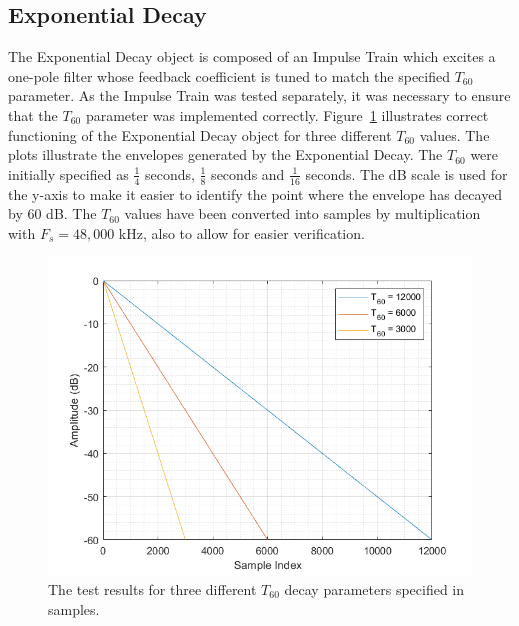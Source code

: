 \documentclass[../main.tex]{subfiles}
\begin{document}
\subsection{Exponential Decay}
The Exponential Decay object is composed of an Impulse Train which excites a one-pole filter whose feedback coefficient is tuned to match the specified $T_{60}$ parameter. As the Impulse Train was tested separately, it was necessary to ensure that the $T_{60}$ parameter was implemented correctly. Figure~\ref{fig:ExpDecayTest1} illustrates correct functioning of the Exponential Decay object for three different $T_{60}$ values. The plots illustrate the envelopes generated by the Exponential Decay. The $T_{60}$ were initially specified as $\frac{1}{4}$ seconds, $\frac{1}{8}$ seconds and $\frac{1}{16}$ seconds. The dB scale is used for the y-axis to make it easier to identify the point where the envelope has decayed by 60 dB. The $T_{60}$ values have been converted into samples by multiplication with $F_s = 48,000$ kHz, also to allow for easier verification.

\begin{figure}[ht]
    \centering
    \includegraphics[scale=.45]{./images/plots/ExpDecayTest1.png}
    \caption{The test results for three different $T_{60}$ decay parameters specified in samples.}
    \label{fig:ExpDecayTest1}
\end{figure}
 
\end{document}
